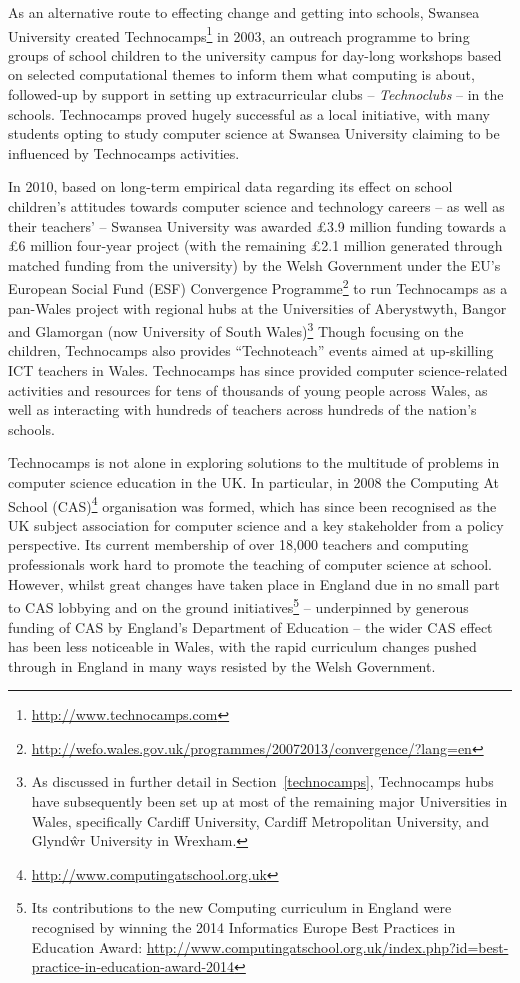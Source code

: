 \documentclass{sig-alternate}
\begin{document}
As an alternative route to effecting change and getting into schools,
Swansea University created
Technocamps\footnote{\url{http://www.technocamps.com}} in 2003, an
outreach programme to bring groups of school children to the
university campus for day-long workshops based on selected
computational themes to inform them what computing is about,
followed-up by support in setting up extracurricular clubs --
\emph{Technoclubs} -- in the schools.  Technocamps proved hugely
successful as a local initiative, with many students opting to study
computer science at Swansea University claiming to be influenced by
Technocamps activities.

In 2010, based on long-term empirical data regarding its effect on
school children's attitudes towards computer science and technology
careers -- as well as their teachers' -- Swansea University was
awarded \pounds 3.9 million funding towards a \pounds 6 million
four-year project (with the remaining \pounds 2.1 million generated
through matched funding from the university) by the Welsh Government
under the EU's European Social Fund (ESF) Convergence
Programme\footnote{\url{http://wefo.wales.gov.uk/programmes/20072013/convergence/?lang=en}}
to run Technocamps as a pan-Wales project with regional hubs at the
Universities of Aberystwyth, Bangor and Glamorgan (now University of
South Wales)\footnote{As discussed in further detail in
Section~\ref{technocamps}, Technocamps hubs have subsequently been set
up at most of the remaining major Universities in Wales, specifically
Cardiff University, Cardiff Metropolitan University, and Glynd\^wr
University in Wrexham.}  Though focusing on the children, Technocamps
also provides ``Technoteach'' events aimed at up-skilling ICT teachers
in Wales.  Technocamps has since provided computer science-related
activities and resources for tens of thousands of young people across
Wales, as well as interacting with hundreds of teachers across
hundreds of the nation's schools.

Technocamps is not alone in exploring solutions to the multitude of
problems in computer science education in the UK.  In particular, in
2008 the Computing At School
(CAS)\footnote{\url{http://www.computingatschool.org.uk}} organisation
was formed, which has since been recognised as the UK subject
association for computer science and a key stakeholder from a policy
perspective. Its current membership of over 18,000 teachers and
computing professionals work hard to promote the teaching of computer
science at school. However, whilst great changes have taken place in
England due in no small part to CAS lobbying and on the ground
initiatives\footnote{Its contributions to the new Computing curriculum
in England were recognised by winning the 2014 Informatics Europe Best
Practices in Education
Award: \url{http://www.computingatschool.org.uk/index.php?id=best-practice-in-education-award-2014}}
-- underpinned by generous funding of CAS by England's Department of
Education -- the wider CAS effect has been less noticeable in Wales,
with the rapid curriculum changes pushed through in England in many
ways resisted by the Welsh Government.
\end{document}

